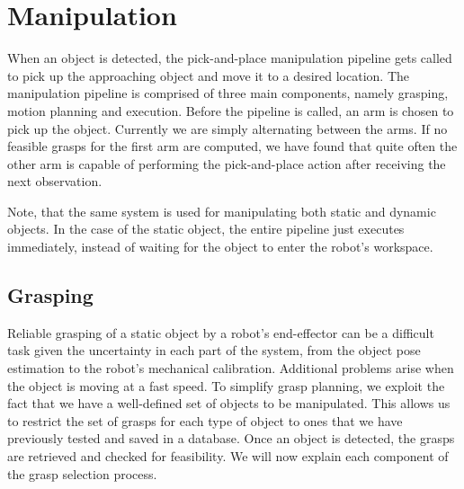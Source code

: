 \documentclass[letterpaper, 10 pt, conference]{ieeeconf}  %
\begin{document}


\section{Manipulation}

When an object is detected, the pick-and-place manipulation pipeline
gets called to pick up the approaching object and move it to a desired
location. The manipulation pipeline is comprised of three main
components, namely grasping, motion planning and execution. Before the
pipeline is called, an arm is chosen to pick up the object. Currently
we are simply alternating between the arms. If no feasible grasps for
the first arm are computed, we have found that quite often the other
arm is capable of performing the pick-and-place action after receiving
the next observation.

Note, that the same system is used for manipulating both static and
dynamic objects. In the case of the static object, the entire pipeline
just executes immediately, instead of waiting for the object to enter
the robot's workspace.

\subsection{Grasping}

Reliable grasping of a static object by a robot's end-effector can be
a difficult task given the uncertainty in each part of the system,
from the object pose estimation to the robot's mechanical
calibration. Additional problems arise when the object is moving at a
fast speed. To simplify grasp planning, we exploit the fact that we
have a well-defined set of objects to be manipulated. This allows us
to restrict the set of grasps for each type of object to ones that we
have previously tested and saved in a database. Once an object is
detected, the grasps are retrieved and checked for feasibility. We
will now explain each component of the grasp selection process.
\end{document}
